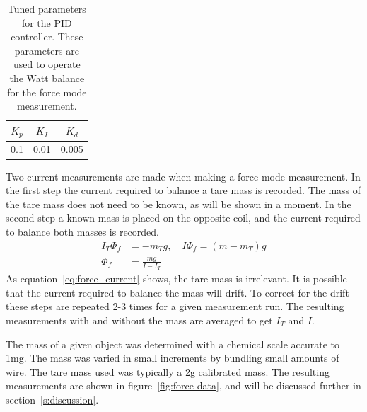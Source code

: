 \documentclass[aps,prstab,reprint,12pt]{revtex4-1}
\begin{document}
\begin{table}[b]
    \centering
    \begin{tabular}{|c|c|c|}\hline
        $K_p$ & $K_I$ & $K_d$ \\\hline
        0.1 & 0.01 & 0.005 \\\hline
    \end{tabular}
    \caption{Tuned parameters for the PID controller. These parameters are used to operate the Watt balance for the force mode measurement.}
    \label{tab:pid}
\end{table}

Two current measurements are made when making a force mode measurement. In the first step the current required to balance a tare mass is recorded. The mass of the tare mass does not need to be known, as will be shown in a moment. In the second step a known mass is placed on the opposite coil, and the current required to balance both masses is recorded. 
\begin{align}
    I_T \Phi_f &= -m_T g ,\quad I \Phi_f = (m-m_T)g \nonumber \\
    \Phi_f &= \frac{mg}{I-I_T} \label{eq:force_current}
\end{align}
As equation~\ref{eq:force_current} shows, the tare mass is irrelevant. It is possible that the current required to balance the mass will drift. To correct for the drift these steps are repeated 2-3 times for a given measurement run. The resulting measurements with and without the mass are averaged to get $I_T$ and $I$.

The mass of a given object was determined with a chemical scale accurate to 1mg. The mass was varied in small increments by bundling small amounts of wire. The tare mass used was typically a 2g calibrated mass. The resulting measurements are shown in figure~\ref{fig:force-data}, and will be discussed further in section~\ref{s:discussion}.

\end{document}

